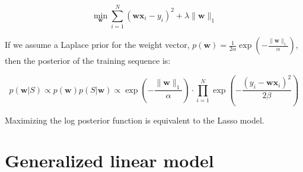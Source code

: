 \documentclass{article}
\begin{document}
	\begin{equation*}
	\min_\mathbf{w} \sum_{i=1}^N (\mathbf{wx}_i - y_i)^2 + \lambda\|\mathbf{w}\|_1
	\end{equation*}
	
	If we assume a Laplace prior for the weight vector, $p(\mathbf{w})=\frac{1}{2\alpha} \exp \left( -\frac{\|\mathbf{w}\|_1}{\alpha} \right)$, then the posterior of the training sequence is:
	
	\begin{equation}
	p(\mathbf{w}|S) \propto p(\mathbf{w}) p(S|\mathbf{w}) \propto \exp \left( -\frac{\|\mathbf{w}\|_1}{\alpha} \right) \cdot \prod_{i=1}^N \exp \left( -\frac{(y_i-\mathbf{wx}_i)^2}{2\beta} \right)
	\end{equation}

Maximizing the log posterior function is equivalent to the Lasso model.

\section{Generalized linear model}
\end{document}
